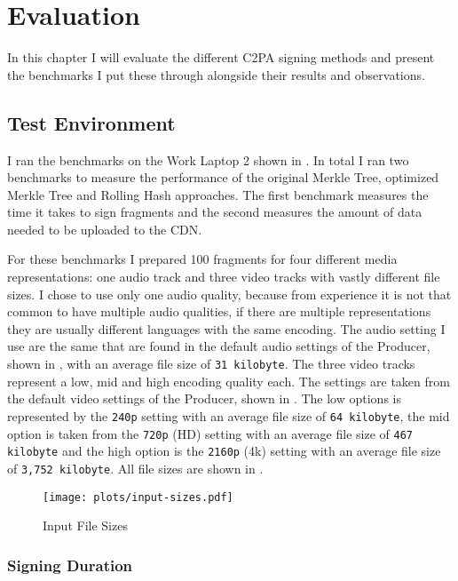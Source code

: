 \chapter{Evaluation\label{cha:chapter6}}

In this chapter I will evaluate the different C2PA signing methods and present the benchmarks I put these through alongside their results and observations.

\section{Test Environment\label{sec:testenvir}}

I ran the benchmarks on the Work Laptop 2 shown in . In total I ran two benchmarks to measure the performance of the original Merkle Tree, optimized Merkle Tree and Rolling Hash approaches. The first benchmark measures the time it takes to sign fragments and the second measures the amount of data needed to be uploaded to the CDN.

For these benchmarks I prepared 100 fragments for four different media representations: one audio track and three video tracks with vastly different file sizes. I chose to use only one audio quality, because from experience it is not that common to have multiple audio qualities, if there are multiple representations they are usually different languages with the same encoding. The audio setting I use are the same that are found in the default audio settings of the Producer, shown in , with an average file size of \texttt{31 kilobyte}. The three video tracks represent a low, mid and high encoding quality each. The settings are taken from the default video settings of the Producer, shown in . The low options is represented by the \texttt{240p} setting with an average file size of \texttt{64 kilobyte}, the mid option is taken from the \texttt{720p} (HD) setting with an average file size of \texttt{467 kilobyte} and the high option is the \texttt{2160p} (4k) setting with an average file size of \texttt{3,752 kilobyte}. All file sizes are shown in .

\begin{figure}[t]
    \centering
    \texttt{[image: plots/input-sizes.pdf]}
    \caption{Input File Sizes}
    \label{fig:file-size}
\end{figure}

\subsection{Signing Duration}

